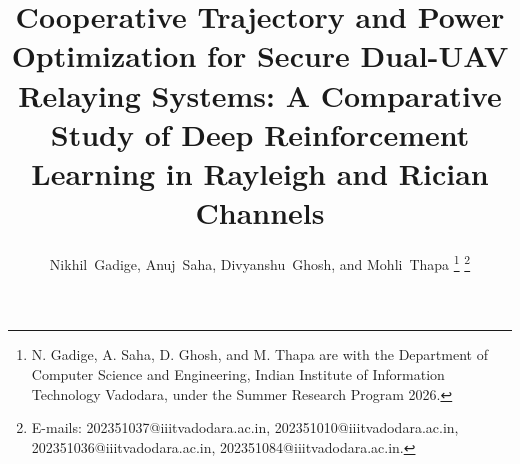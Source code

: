 \documentclass[journal,onecolumn]{IEEEtran}
\begin{document}
\title{Cooperative Trajectory and Power Optimization for Secure Dual-UAV Relaying Systems: A Comparative Study of Deep Reinforcement Learning in Rayleigh and Rician Channels}

\author{
Nikhil~Gadige,
Anuj~Saha,
Divyanshu~Ghosh,
and Mohli~Thapa%
\thanks{N. Gadige, A. Saha, D. Ghosh, and M. Thapa are with the Department of Computer Science and Engineering, Indian Institute of Information Technology Vadodara, under the Summer Research Program 2026.}%
\thanks{E-mails: 202351037@iiitvadodara.ac.in, 202351010@iiitvadodara.ac.in, 202351036@iiitvadodara.ac.in, 202351084@iiitvadodara.ac.in.}
}



\maketitle
\end{document}
